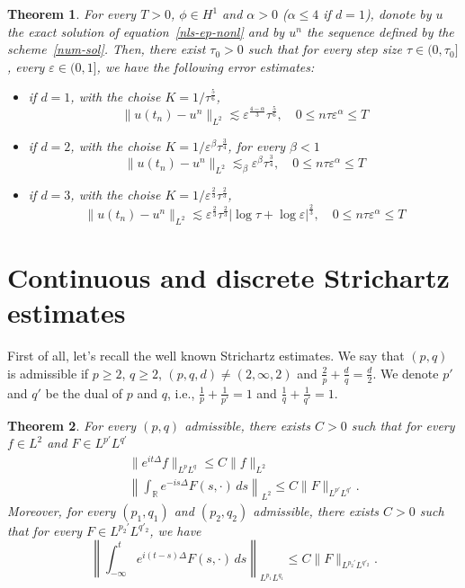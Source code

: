 \documentclass[10pt,a4paper]{article}
\newtheorem{theorem}{Theorem}[section]
\begin{document}
  \begin{theorem}
    For every \( T > 0 \), \( \phi \in H^1 \) and \(\alpha > 0\) (\(\alpha \leq 4\) 
    if \(d=1\)), donote by \(u\) the exact solution of equation~\eqref{nls-ep-nonl} 
    and by \(u^n\) the sequence defined by the scheme~\eqref{num-sol}. Then, 
    there exist \(\tau_0 > 0\) such that for every step size \(\tau \in (0,\tau_0]\),
    every \( \varepsilon \in (0,1] \), we have the following error estimates:
    \begin{itemize}
      \item if \(d=1\), with the choise \(K=1/\tau^\frac56\),
        \[ \|u(t_n)-u^n\|_{L^2} \lesssim \varepsilon^\frac{4-\alpha}3\tau^\frac56, \quad 
        0 \leq n\tau\varepsilon^\alpha \leq T \]
      \item if \(d=2\), with the choise \(K=1/\varepsilon^\beta\tau^\frac34\),
        for every \(\beta<1\) 
        \[ \|u(t_n)-u^n\|_{L^2} \lesssim_\beta \varepsilon^\beta \tau^\frac34, \quad 
        0 \leq n\tau\varepsilon^\alpha \leq T \]
      \item if \(d=3\), with the choise \(K=1/\varepsilon^\frac23\tau^\frac23\),
        \[ \|u(t_n)-u^n\|_{L^2} \lesssim \varepsilon^\frac23 \tau^\frac23|\log\tau+\log\varepsilon|^\frac23, 
        \quad 0 \leq n\tau\varepsilon^\alpha \leq T \]
    \end{itemize}
  \end{theorem}

  \section{Continuous and discrete Strichartz estimates}

  First of all, let's recall the well known Strichartz estimates. We say that 
  \( (p,q) \) is admissible if \(p \geq 2\), \(q \geq 2\), \((p,q,d) \neq (2,\infty,2)\)
  and \( \frac2p + \frac{d}q = \frac{d}2 \). We denote \(p'\)
  and \(q'\) be the dual of \(p\) and \(q\), i.e., \(\frac1p+\frac1{p'} = 1\) 
  and \(\frac1q+\frac1{q'} = 1\).

  \begin{theorem}
    For every \((p,q)\) admissible, there exists \(C > 0\) such that for every 
    \( f \in L^2 \) and \( F \in L^{p'} L^{q'} \)
    \begin{eqnarray}
      \label{Tc} & & \|e^{it \Delta} f \|_{L^p{L^q}} \leq C \| f\|_{L^2} \\
      \label{T*c} & & \left \| \int_{\mathbb R} e^{-is \Delta } F(s,\cdot)\, ds\right\|_{L^2} 
      \leq C \|F \|_{L^{p'} L^{q'}}.
    \end{eqnarray}
    Moreover, for every \((p_1, q_1)\) and \((p_2, q_2)\) admissible, there exists
    \(C > 0\) such that for every \(F \in L^{p_2'} L^{q'_2}\), we have
    \begin{equation}\label{TT*c} 
      \left\| \int_{-\infty}^t e^{i ( t-s ) \Delta } F(s,\cdot) \, ds \right\|_{L^{p_{1}} L^{q_{1}}}
      \leq  C \|F \|_{L^{p_{2}'} L^{q'_{2}}}.
    \end{equation}
  \end{theorem}
\end{document}
